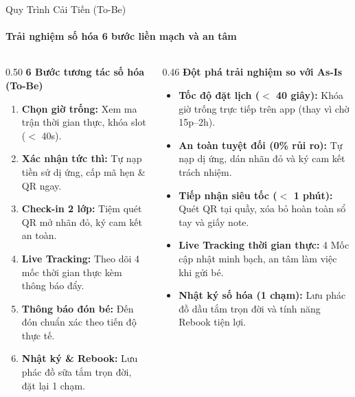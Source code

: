 \begin{frame}{Quy Trình Cải Tiến (To-Be)}
  \framesubtitle{\color{white!90}\textbf{Trải nghiệm số hóa 6 bước liền mạch và an tâm}}

  \begin{columns}[T]
    \begin{column}{0.50\textwidth}
      {\color{PetcarePrimary}\large \textbf{6 Bước tương tác số hóa (To-Be)}}\\[2mm]
      \small
      \begin{enumerate}
        \setlength\itemsep{1.8mm}
        \item \textbf{Chọn giờ trống:} Xem ma trận thời gian thực, khóa slot ($<$ 40s).
        \item \textbf{Xác nhận tức thì:} Tự nạp tiền sử dị ứng, cấp mã hẹn \& QR ngay.
        \item \textbf{Check-in 2 lớp:} Tiệm quét QR mở nhãn đỏ, ký cam kết an toàn.
        \item \textbf{Live Tracking:} Theo dõi 4 mốc thời gian thực kèm thông báo đẩy.
        \item \textbf{Thông báo đón bé:} Đến đón chuẩn xác theo tiến độ thực tế.
        \item \textbf{Nhật ký \& Rebook:} Lưu phác đồ sữa tắm trọn đời, đặt lại 1 chạm.
      \end{enumerate}
    \end{column}

    \begin{column}{0.46\textwidth}
      {\color{PetcarePrimary}\large \textbf{Đột phá trải nghiệm so với As-Is}}\\[2mm]
      \small
      \begin{itemize}
        \setlength\itemsep{2.2mm}
        \item \textbf{Tốc độ đặt lịch ($<$ 40 giây):} Khóa giờ trống trực tiếp trên app (thay vì chờ 15p--2h).
        \item \textbf{An toàn tuyệt đối (0\% rủi ro):} Tự nạp dị ứng, dán nhãn đỏ và ký cam kết trách nhiệm.
        \item \textbf{Tiếp nhận siêu tốc ($<$ 1 phút):} Quét QR tại quầy, xóa bỏ hoàn toàn sổ tay và giấy note.
        \item \textbf{Live Tracking thời gian thực:} 4 Mốc cập nhật minh bạch, an tâm làm việc khi gửi bé.
        \item \textbf{Nhật ký số hóa (1 chạm):} Lưu phác đồ dầu tắm trọn đời và tính năng Rebook tiện lợi.
      \end{itemize}
    \end{column}
  \end{columns}
\end{frame}
